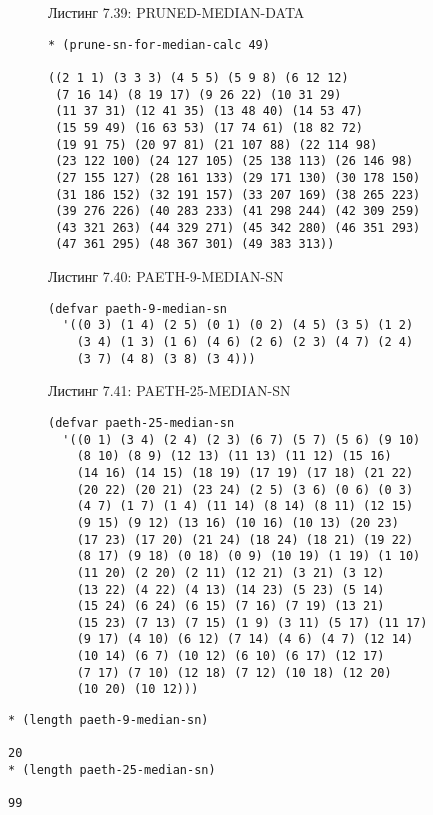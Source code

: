 \begin{figure}Листинг 7.39: PRUNED-MEDIAN-DATA\label{listing_7.39}
\listbegin
\begin{verbatim}
* (prune-sn-for-median-calc 49)

((2 1 1) (3 3 3) (4 5 5) (5 9 8) (6 12 12)
 (7 16 14) (8 19 17) (9 26 22) (10 31 29)
 (11 37 31) (12 41 35) (13 48 40) (14 53 47)
 (15 59 49) (16 63 53) (17 74 61) (18 82 72)
 (19 91 75) (20 97 81) (21 107 88) (22 114 98)
 (23 122 100) (24 127 105) (25 138 113) (26 146 98)
 (27 155 127) (28 161 133) (29 171 130) (30 178 150) 
 (31 186 152) (32 191 157) (33 207 169) (38 265 223)
 (39 276 226) (40 283 233) (41 298 244) (42 309 259)
 (43 321 263) (44 329 271) (45 342 280) (46 351 293)
 (47 361 295) (48 367 301) (49 383 313))
\end{verbatim}
\listend
\end{figure}

\begin{figure}Листинг 7.40: PAETH-9-MEDIAN-SN\label{listing_7.40}
\listbegin
\begin{verbatim}
(defvar paeth-9-median-sn
  '((0 3) (1 4) (2 5) (0 1) (0 2) (4 5) (3 5) (1 2)
    (3 4) (1 3) (1 6) (4 6) (2 6) (2 3) (4 7) (2 4)
    (3 7) (4 8) (3 8) (3 4)))
\end{verbatim}
\listend
\end{figure}

\begin{figure}Листинг 7.41: PAETH-25-MEDIAN-SN\label{listing_7.41}
\listbegin
\begin{verbatim}
(defvar paeth-25-median-sn
  '((0 1) (3 4) (2 4) (2 3) (6 7) (5 7) (5 6) (9 10)
    (8 10) (8 9) (12 13) (11 13) (11 12) (15 16)
    (14 16) (14 15) (18 19) (17 19) (17 18) (21 22)
    (20 22) (20 21) (23 24) (2 5) (3 6) (0 6) (0 3)
    (4 7) (1 7) (1 4) (11 14) (8 14) (8 11) (12 15)
    (9 15) (9 12) (13 16) (10 16) (10 13) (20 23)
    (17 23) (17 20) (21 24) (18 24) (18 21) (19 22)
    (8 17) (9 18) (0 18) (0 9) (10 19) (1 19) (1 10)
    (11 20) (2 20) (2 11) (12 21) (3 21) (3 12)
    (13 22) (4 22) (4 13) (14 23) (5 23) (5 14)
    (15 24) (6 24) (6 15) (7 16) (7 19) (13 21)
    (15 23) (7 13) (7 15) (1 9) (3 11) (5 17) (11 17)
    (9 17) (4 10) (6 12) (7 14) (4 6) (4 7) (12 14)
    (10 14) (6 7) (10 12) (6 10) (6 17) (12 17)
    (7 17) (7 10) (12 18) (7 12) (10 18) (12 20)
    (10 20) (10 12)))
\end{verbatim}
\listend
\end{figure}

\begin{verbatim}
* (length paeth-9-median-sn)

20
* (length paeth-25-median-sn)

99
\end{verbatim}

